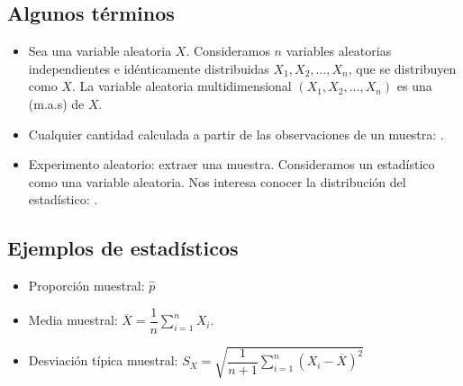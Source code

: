 \subsection{Algunos términos}
\begin{tcolorbox}[colback=blue!5!white, colframe=blue!75!black, title=\textbf{Definición}]
\begin{itemize}[label=\textbullet]
  \item Sea una variable aleatoria $X$. Consideramos $n$ variables aleatorias independientes e idénticamente distribuidas  $X_1,X_2,\dots,X_n$, que se distribuyen como $X$. La variable aleatoria multidimensional  $(X_1,X_2,\dots,X_n)$ es una  (m.a.s) de $X$.
  \item Cualquier cantidad calculada a partir de las observaciones de un muestra: .
  \item Experimento aleatorio: extraer una muestra. Consideramos un estadístico como una variable aleatoria. Nos interesa conocer la distribución del estadístico: . 
\end{itemize}
\end{tcolorbox}
\subsection{Ejemplos de estadísticos}
\begin{itemize}[label=\textbullet]
  \item Proporción muestral: $\hat{p}$
  \item Media muestral: $\overline{X}=\dfrac{1}{n}\sum_{i=1}^{n} X_i$.
  \item Desviación típica muestral: $S_X=\sqrt{\dfrac{1}{n+1}\sum_{i=1}^{n} (X_i-\overline{X})^2} $
\end{itemize}
